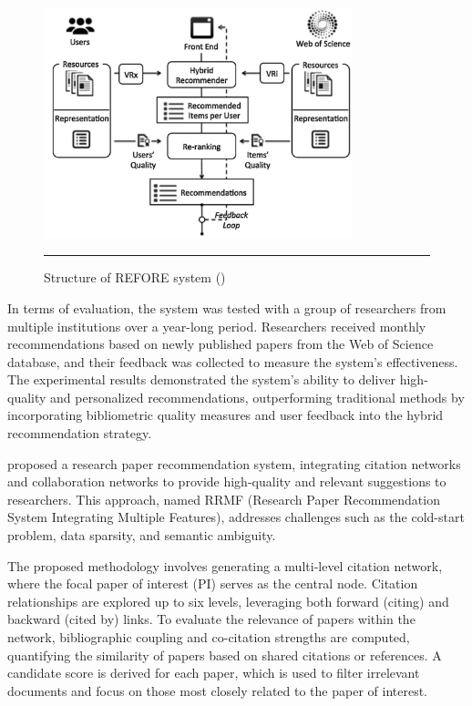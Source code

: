 \begin{figure}[htbp]
    \centering
 \includegraphics[width=0.8\textwidth]{03_Figures/literature-review/refore.png}
     \rule{35em}{0.5pt}
    \caption{Structure of REFORE system (\cite{refore})}
 \label{fig:refore}
\end{figure}

In terms of evaluation, the system was tested with a group of researchers from multiple institutions over a year-long period.
Researchers received monthly recommendations based on newly published papers from the Web of Science database, and their feedback was collected to measure the system's effectiveness.
The experimental results demonstrated the system's ability to deliver high-quality and personalized recommendations, outperforming traditional methods by incorporating bibliometric quality measures and user feedback into the hybrid recommendation strategy.

\cite{Kanwal2024} proposed a research paper recommendation system, integrating citation networks and collaboration networks to provide high-quality and relevant suggestions to researchers.
This approach, named RRMF (Research Paper Recommendation System Integrating Multiple Features), addresses challenges such as the cold-start problem, data sparsity, and semantic ambiguity.

The proposed methodology involves generating a multi-level citation network, where the focal paper of interest (PI) serves as the central node.
Citation relationships are explored up to six levels, leveraging both forward (citing) and backward (cited by) links.
To evaluate the relevance of papers within the network, bibliographic coupling and co-citation strengths are computed, quantifying the similarity of papers based on shared citations or references.
A candidate score is derived for each paper, which is used to filter irrelevant documents and focus on those most closely related to the paper of interest.

